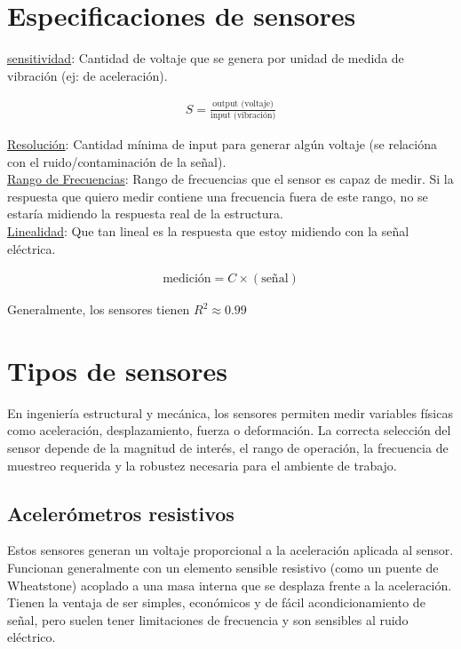 

\section{Especificaciones de sensores}

\underline{sensitividad}: Cantidad de voltaje que se genera por unidad de medida de vibración (ej: de aceleración).

\begin{align*}
    S = \frac{\text{output (voltaje)}}{\text{input (vibración)}}
\end{align*}

\underline{Resolución}: Cantidad mínima de input para generar algún voltaje (se relacióna con el ruido/contaminación de la señal). \\

\underline{Rango de Frecuencias}: Rango de frecuencias que el sensor es capaz de medir. Si la respuesta que quiero medir contiene una frecuencia fuera de este rango, no se estaría midiendo la respuesta real de la estructura. \\

\underline{Linealidad}: Que tan lineal es la respuesta que estoy midiendo con la señal eléctrica.

\begin{align*}
    \text{medición} = C \times (\text{señal})
\end{align*}

Generalmente, los sensores tienen $R^2 \approx 0.99$

\section{Tipos de sensores}

En ingeniería estructural y mecánica, los sensores permiten medir variables físicas como aceleración, desplazamiento, fuerza o deformación. 
La correcta selección del sensor depende de la magnitud de interés, el rango de operación, la frecuencia de muestreo requerida y la robustez necesaria para el ambiente de trabajo. 

\subsection{Acelerómetros resistivos}
Estos sensores generan un voltaje proporcional a la aceleración aplicada al sensor. 
Funcionan generalmente con un elemento sensible resistivo (como un puente de Wheatstone) acoplado a una masa interna que se desplaza frente a la aceleración.  
Tienen la ventaja de ser simples, económicos y de fácil acondicionamiento de señal, pero suelen tener limitaciones de frecuencia y son sensibles al ruido eléctrico.

